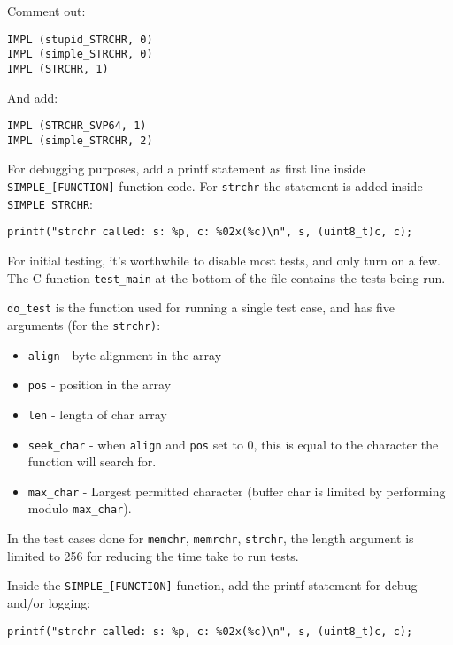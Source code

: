 Comment out:

\begin{verbatim}
IMPL (stupid_STRCHR, 0)
IMPL (simple_STRCHR, 0)
IMPL (STRCHR, 1)
\end{verbatim}

And add:

\begin{verbatim}
IMPL (STRCHR_SVP64, 1)
IMPL (simple_STRCHR, 2)
\end{verbatim}

For debugging purposes, add a printf statement as first line inside
\texttt{SIMPLE\_[FUNCTION]} function code.
For \texttt{strchr} the statement is added inside \texttt{SIMPLE\_STRCHR}:

\begin{verbatim}
printf("strchr called: s: %p, c: %02x(%c)\n", s, (uint8_t)c, c);
\end{verbatim}

For initial testing, it's worthwhile to disable most tests,
and only turn on a few. The C function \texttt{test\_main} at the bottom
of the file contains the tests being run.\par

\texttt{do\_test} is the function used for running a single test case, and
has five arguments (for the \texttt{strchr)}:

\begin{itemize}
  \item \texttt{align} - byte alignment in the array
  \item \texttt{pos} - position in the array
  \item \texttt{len} - length of char array
  \item \texttt{seek\_char} - when \texttt{align} and \texttt{pos} set to 0,
  this is equal to the character the function will search for.
  \item \texttt{max\_char} - Largest permitted character (buffer char is
  limited by performing modulo \texttt{max\_char}).
\end{itemize}

In the test cases done for \texttt{memchr}, \texttt{memrchr}, \texttt{strchr},
the length argument is limited to 256 for reducing the time take to run tests.

Inside the \texttt{SIMPLE\_[FUNCTION]} function, add the printf statement
for debug and/or logging:

\begin{verbatim}
printf("strchr called: s: %p, c: %02x(%c)\n", s, (uint8_t)c, c);
\end{verbatim}

